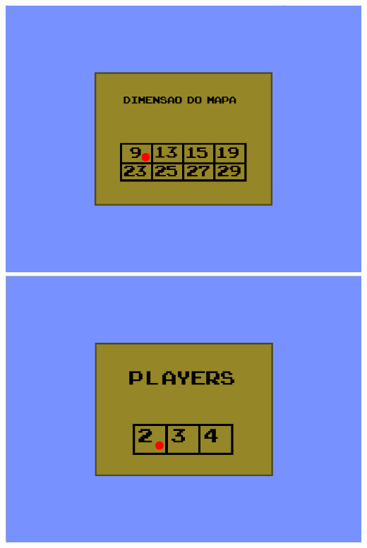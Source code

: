 \documentclass[a4paper]{article}
\begin{document}
\begin{center}
\includegraphics[scale=0.20]{dim.jpg}  \includegraphics[scale=0.20]{players.jpg}
\end{center}
\end{document}
